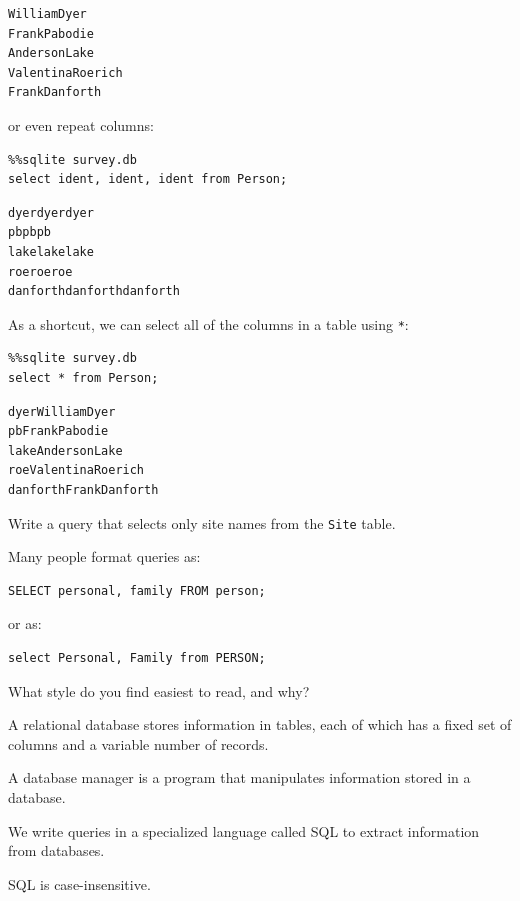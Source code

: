 \documentclass{book}
\begin{document}
\begin{verbatim}
WilliamDyer
FrankPabodie
AndersonLake
ValentinaRoerich
FrankDanforth
\end{verbatim}

or even repeat columns:

\begin{verbatim}
%%sqlite survey.db
select ident, ident, ident from Person;
\end{verbatim}

\begin{verbatim}
dyerdyerdyer
pbpbpb
lakelakelake
roeroeroe
danforthdanforthdanforth
\end{verbatim}

As a shortcut, we can select all of the columns in a table using
\texttt{*}:

\begin{verbatim}
%%sqlite survey.db
select * from Person;
\end{verbatim}

\begin{verbatim}
dyerWilliamDyer
pbFrankPabodie
lakeAndersonLake
roeValentinaRoerich
danforthFrankDanforth
\end{verbatim}

\begin{challenge}
  Write a query that selects only site names from the \texttt{Site}
  table.
\end{challenge}

\begin{challenge}
  Many people format queries as:

\begin{verbatim}
SELECT personal, family FROM person;
\end{verbatim}

  or as:

\begin{verbatim}
select Personal, Family from PERSON;
\end{verbatim}

  What style do you find easiest to read, and why?
\end{challenge}

\begin{keypoints}
\begin{swcitemize}
\item
  A relational database stores information in tables, each of which has
  a fixed set of columns and a variable number of records.
\item
  A database manager is a program that manipulates information stored in
  a database.
\item
  We write queries in a specialized language called SQL to extract
  information from databases.
\item
  SQL is case-insensitive.
\end{swcitemize}
\end{keypoints}
\end{document}
